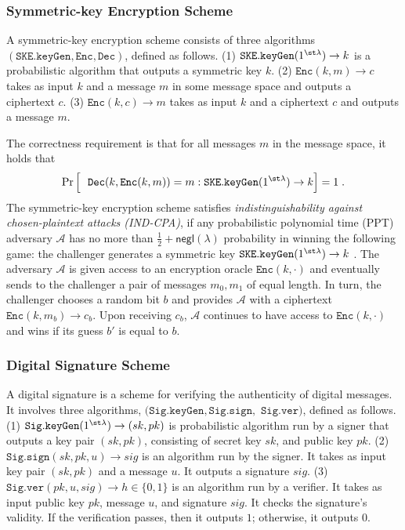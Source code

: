 \subsubsection{Symmetric-key Encryption Scheme} \label{subsec:SKE}

A symmetric-key encryption scheme consists of three algorithms $(\mathtt{SKE.keyGen},  \mathtt{Enc}, \mathtt{Dec})$,  defined as follows. (1) $\mathtt{SKE.keyGen}(1^{\st \lambda})\rightarrow k$ is a probabilistic algorithm that outputs a symmetric key $k$. (2) $\mathtt{Enc}(k,m)\rightarrow c$ takes as input $k$ and a message $m$ in some message space and outputs a ciphertext $c$. (3) $\mathtt{Enc}(k,c)\rightarrow m$ takes as input $k$ and a ciphertext $c$ and outputs a message $m$.

The correctness requirement is that for all messages $m$  in the message space, it holds that 
\[\Pr\Big[\  \  \mathtt{Dec}( k, \mathtt{Enc}(k, m))=m: \mathtt{SKE.keyGen}(1^{\st \lambda})\rightarrow k  \Big]=1\;.\]
 The symmetric-key encryption scheme satisfies \emph{indistinguishability against chosen-plaintext attacks (IND-CPA)}, if any probabilistic polynomial time (PPT) adversary $\mathcal{A}$ has no more than $\frac{1}{2}+\mathsf{negl}(\lambda)$ probability in winning the following game: the challenger generates a symmetric key $\mathtt{SKE.keyGen}(1^{\st \lambda})\rightarrow k$ . The adversary $\mathcal{A}$ is given access to an encryption oracle $\mathtt{Enc}(k,\cdot)$ and eventually sends to the challenger a pair of messages $m_0,m_1$ of equal length. In turn, the challenger chooses a random bit $b$ and provides $\mathcal{A}$ with a ciphertext $\mathtt{Enc}(k,m_b)\rightarrow c_b$. Upon receiving $c_b$,  $\mathcal{A}$ continues to have access to $\mathtt{Enc}(k,\cdot)$ and wins if its guess $b'$ is equal to $b$.
 
 
\subsubsection{Digital Signature Scheme}\label{subsec:DS}


A digital signature is a scheme for verifying the authenticity of digital messages. It involves three algorithms, $(\mathtt{Sig.keyGen},  \mathtt{Sig.sign}, $ $\mathtt{Sig.ver})$,  defined as follows. (1) $\mathtt{Sig.keyGen}(1^{\st \lambda})\rightarrow (sk,pk)$ is probabilistic algorithm run by  a  signer that outputs a key pair $(sk,pk)$, consisting of secret key $sk$, and public key $pk$. (2) $\mathtt{Sig.sign}(sk, pk, u)\rightarrow sig$ is an algorithm run by the signer. It takes as input  key pair $(sk,pk)$ and a message $u$. It outputs a signature $sig$. (3) $\mathtt{Sig.ver}( pk, u, sig)\rightarrow h\in\{0,1\}$ is an algorithm run by a verifier. It takes as input  public key $pk$,  message $u$, and signature $sig$. It checks the signature's validity.   If the verification passes, then it outputs $1$; otherwise, it outputs $0$.  

